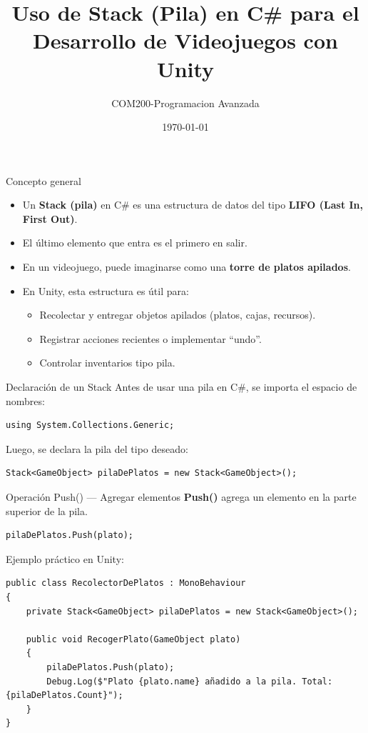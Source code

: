 \documentclass{beamer}
\title{Uso de Stack (Pila) en C\# para el Desarrollo de Videojuegos con Unity}
\author{COM200-Programacion Avanzada}
\date{\today}
\begin{document}
\begin{frame}
\titlepage
\end{frame}

\begin{frame}{Concepto general}
\begin{itemize}
    \item Un \textbf{Stack (pila)} en C\# es una estructura de datos del tipo \textbf{LIFO (Last In, First Out)}.
    \item El último elemento que entra es el primero en salir.
    \item En un videojuego, puede imaginarse como una \textbf{torre de platos apilados}.
    \item En Unity, esta estructura es útil para:
    \begin{itemize}
        \item Recolectar y entregar objetos apilados (platos, cajas, recursos).
        \item Registrar acciones recientes o implementar “undo”.
        \item Controlar inventarios tipo pila.
    \end{itemize}
\end{itemize}
\end{frame}

\begin{frame}[fragile]{Declaración de un Stack}
Antes de usar una pila en C\#, se importa el espacio de nombres:
\begin{lstlisting}
using System.Collections.Generic;
\end{lstlisting}

Luego, se declara la pila del tipo deseado:
\begin{lstlisting}
Stack<GameObject> pilaDePlatos = new Stack<GameObject>();
\end{lstlisting}
\end{frame}

\begin{frame}[fragile]{Operación Push() — Agregar elementos}
\textbf{Push()} agrega un elemento en la parte superior de la pila.
\begin{lstlisting}
pilaDePlatos.Push(plato);
\end{lstlisting}

Ejemplo práctico en Unity:
\begin{lstlisting}
public class RecolectorDePlatos : MonoBehaviour
{
    private Stack<GameObject> pilaDePlatos = new Stack<GameObject>();

    public void RecogerPlato(GameObject plato)
    {
        pilaDePlatos.Push(plato);
        Debug.Log($"Plato {plato.name} añadido a la pila. Total: {pilaDePlatos.Count}");
    }
}
\end{lstlisting}
\end{frame}
\end{document}
